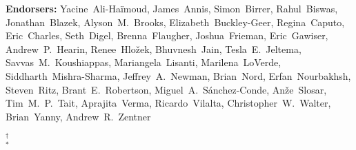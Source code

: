 \begin{raggedright}
\textbf{Endorsers:}
Yacine~Ali-Ha\"imoud,
James~Annis,
Simon~Birrer,
Rahul~Biswas,
Jonathan~Blazek,
Alyson~M.~Brooks,
Elizabeth~Buckley-Geer,
Regina~Caputo,
Eric~Charles,
Seth~Digel,
Brenna~Flaugher,
Joshua~Frieman,
Eric~Gawiser,
Andrew~P.~Hearin,
Renee~Hlo\v{z}ek,
Bhuvnesh~Jain,
Tesla~E.~Jeltema,
Savvas~M.~Koushiappas,
Mariangela~Lisanti,
Marilena~LoVerde,
Siddharth~Mishra-Sharma,
Jeffrey~A.~Newman,
Brian~Nord,
Erfan~Nourbakhsh,
Steven~Ritz,
Brant~E.~Robertson,
Miguel~A.~S\'anchez-Conde,
An\v{z}e~Slosar,
Tim~M.~P.~Tait,
Aprajita~Verma,
Ricardo~Vilalta,
Christopher~W.~Walter,
Brian~Yanny,
Andrew~R.~Zentner



$^\dagger$  \\
$^*$ 

\begin{multicols}{2}
\scriptsize
\parskip=4pt


\end{multicols}
\end{raggedright}
